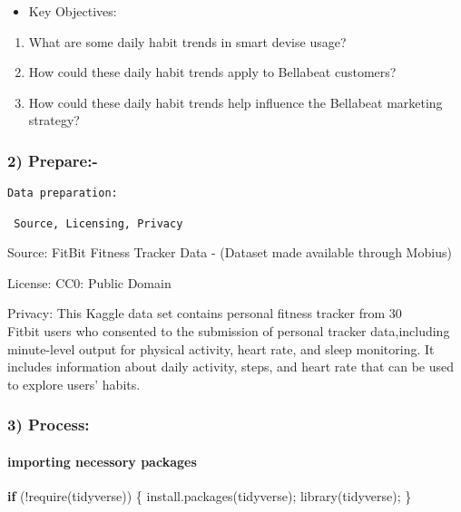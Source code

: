 \documentclass[
]{article}
\newenvironment{Shaded}{\begin{snugshade}}{\end{snugshade}}
\newcommand{\ControlFlowTok}[1]{\textcolor[rgb]{0.13,0.29,0.53}{\textbf{#1}}}
\newcommand{\FunctionTok}[1]{\textcolor[rgb]{0.00,0.00,0.00}{#1}}
\newcommand{\NormalTok}[1]{#1}
\newcommand{\SpecialCharTok}[1]{\textcolor[rgb]{0.00,0.00,0.00}{#1}}
\newcommand{\StringTok}[1]{\textcolor[rgb]{0.31,0.60,0.02}{#1}}
\providecommand{\tightlist}{%
  \setlength{\itemsep}{0pt}\setlength{\parskip}{0pt}}
\begin{document}
\begin{itemize}
\tightlist
\item
  Key Objectives:
\end{itemize}

\begin{enumerate}
\def\labelenumi{\arabic{enumi}.}
\tightlist
\item
  What are some daily habit trends in smart devise usage?
\item
  How could these daily habit trends apply to Bellabeat customers?
\item
  How could these daily habit trends help influence the Bellabeat
  marketing strategy?
\end{enumerate}

\hypertarget{prepare-}{%
\subsubsection{2) Prepare:-}\label{prepare-}}

\begin{verbatim}
Data preparation:

 Source, Licensing, Privacy
\end{verbatim}

Source: FitBit Fitness Tracker Data - (Dataset made available through
Mobius)

License: CC0: Public Domain

Privacy: This Kaggle data set contains personal fitness tracker from
30\\
Fitbit users who consented to the submission of personal tracker
data,including minute-level output for physical activity, heart rate,
and sleep monitoring. It includes information about daily activity,
steps, and heart rate that can be used to explore users' habits.

\hypertarget{process}{%
\subsubsection{3) Process:}\label{process}}

\hypertarget{importing-necessory-packages}{%
\paragraph{importing necessory
packages}\label{importing-necessory-packages}}

\begin{Shaded}
\begin{Highlighting}[]
 \ControlFlowTok{if}\NormalTok{ (}\SpecialCharTok{!}\FunctionTok{require}\NormalTok{(}\StringTok{\textquotesingle{}tidyverse\textquotesingle{}}\NormalTok{))}
\NormalTok{ \{}
  \FunctionTok{install.packages}\NormalTok{(}\StringTok{\textquotesingle{}tidyverse\textquotesingle{}}\NormalTok{);}
   \FunctionTok{library}\NormalTok{(tidyverse);}
\NormalTok{ \}}
\end{Highlighting}
\end{Shaded}
\end{document}
